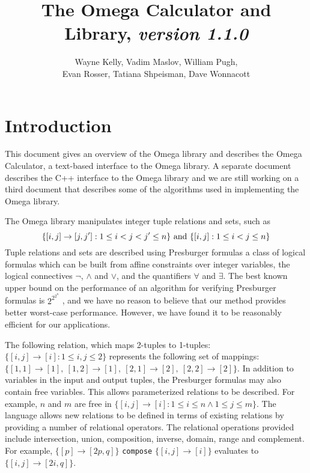 





\title{{\bf The Omega Calculator and Library}, {\em version 1.1.0}}


\author{
Wayne Kelly, Vadim Maslov, William Pugh, \\
Evan Rosser, Tatiana Shpeisman, Dave Wonnacott
}

\maketitle


\section{Introduction}

This document gives an overview of the Omega library and 
describes the Omega Calculator, a text-based interface to
the Omega library. A separate document describes the C++ interface 
to the Omega library and we are still working on a third document that describes
some of the algorithms used in implementing the Omega library.

The Omega library 
manipulates integer tuple relations and sets, such as
$$\{[i,j] \rightarrow [j,j'] : 1 \leq i < j < j' \leq n\}
{\rm\ and\ } \{ [ i ,j ] : 1 \leq i < j \leq n\}$$
Tuple relations and
sets are described using Presburger 
formulas\cite{presburger1,Shostak77,presburger2,presburger2a} a class of logical
formulas which can be built from affine constraints over integer
variables, the logical connectives $\neg$, $\land$ and $\lor$, and the
quantifiers $\forall$ and $\exists$.
The best known upper bound on the performance of an algorithm for
verifying Presburger formulas is $2^{2^{2^{n}}}$ \cite{presburger3},
and we have no
reason to believe that our method provides better worst-case
performance. However,  we have found it
to be reasonably efficient for our applications.

The following relation, which maps 2-tuples to 1-tuples:
$\{[i, j] \rightarrow [i] : 1 \le i,j \le 2\}$
represents the following set of mappings: $\{[1,1]\rightarrow[1],\
[1,2]\rightarrow[1],\ [2,1]\rightarrow[2],\ [2,2]\rightarrow[2]\}$.
In addition to variables in the input and output tuples, the Presburger 
formulas may also contain free variables. This allows parameterized relations to be described. 
For example, $n$ and $m$ are free in 
$\{ [i, j] \rightarrow [i] : 1 \le i \le n \land 1 \le j \le m \}$. 
The language allows new relations to be defined in terms of existing relations 
by providing a number of relational operators.  The relational operations 
provided include intersection, union, composition, inverse, domain, range and complement.  
For example, $\{[p] \rightarrow [2p, q]\}$ {\tt compose}
$\{[i,j]\rightarrow[i]\}$ evaluates to
$\{[i,j]\rightarrow[2i,q]\}$.

